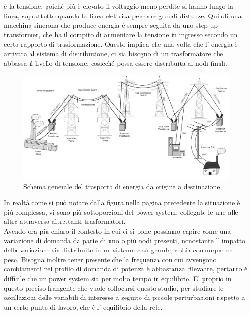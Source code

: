 \documentclass[Lau,noexaminfo]{sapthesis}
\begin{document}
	è la tensione, poiché più è elevato il voltaggio meno perdite si hanno lungo la linea, soprattutto quando la linea elettrica percorre grandi distanze. Quindi una macchina
	sincrona che produce energia è sempre seguita da uno step-up transformer, che ha il compito di aumentare la tensione in ingresso secondo un certo rapporto di trasformazione.
	Questo implica che una volta che l' energia è arrivata al sistema di distribuzione, ci sia bisogno di un trasformatore che abbassa il livello di tensione, cosicché possa essere
	distribuita ai nodi finali.
	\begin{figure}
			\centering
			\includegraphics[height=0.450\textheight,angle=-90]{trasmissione}
			\caption{Schema generale del trasporto di energia da origine a destinazione}
	\end{figure}

	In realtà come si può notare dalla figura nella pagina precedente
	la situazione è più complessa, vi sono più sottoporzioni del power system, collegate le une alle altre attraverso altrettanti trasformatori.\\
	Avendo ora più chiaro il contesto in cui ci si pone possiamo capire come una variazione di domanda da parte di uno o più nodi presenti, nonostante l' impatto della
	variazione sia distribuito in un sistema così grande, abbia comunque un peso. Bisogna inoltre tener presente che la frequenza con cui avvengono cambiamenti nel profilo
	di domanda di potenza è abbastanza rilevante, pertanto è difficile che un power system sia per molto tempo in equilibrio. E' proprio in questo preciso frangente che vuole 
	collocarsi questo studio, per studiare le oscillazioni delle variabili di interesse a seguito di piccole perturbazioni rispetto a un certo punto di lavoro, che è l' equilibrio 
	della rete.
	\chapter{}
\end{document}
